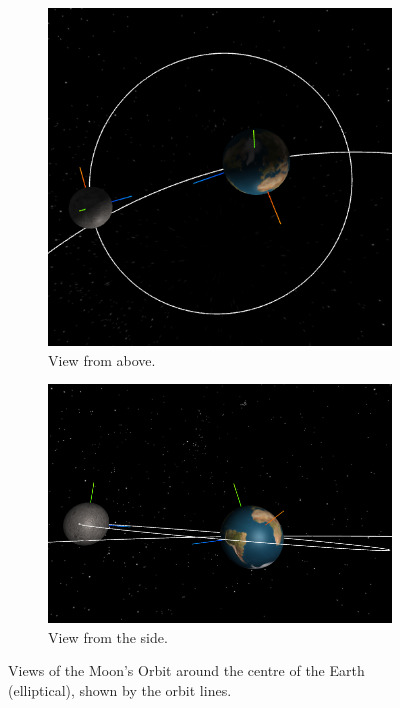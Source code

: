 \documentclass[12pt]{article}
\begin{document}
\begin{figure}[H]
        \centering
        \begin{subfigure}[b]{0.4\textwidth}
                \includegraphics[width=\textwidth]{images/moonorbitearth1}
                \caption{View from above.}
                \label{fig: The Moon orbiting the Earth.}
       \end{subfigure}
        \begin{subfigure}[b]{0.4\textwidth}
                \includegraphics[width=\textwidth]{images/moonorbitearth2}
                \caption{View from the side.}
                \label{fig:The Earth orbiting the Sun}
       \end{subfigure}
       \caption{Views of the Moon's Orbit around the centre of the Earth (elliptical), shown by the orbit lines.}\label{fig: The Moon orbitng the centre of the Earth}
\end{figure}
\end{document}
